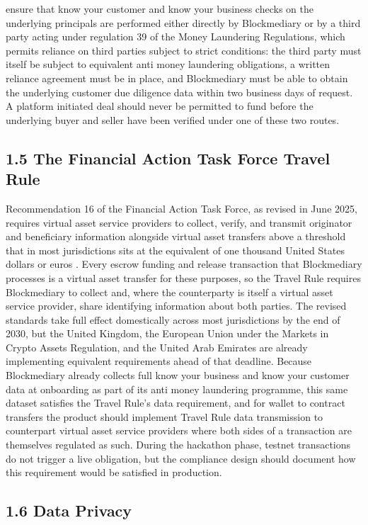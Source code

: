 \documentclass[12pt, a4paper]{article}
\begin{document}
ensure that know your customer and know your business checks on the underlying principals
are performed either directly by Blockmediary or by a third party acting under regulation
39 of the Money Laundering Regulations, which permits reliance on third parties subject to
strict conditions: the third party must itself be subject to equivalent anti money
laundering obligations, a written reliance agreement must be in place, and Blockmediary
must be able to obtain the underlying customer due diligence data within two business days
of request. A platform initiated deal should never be permitted to fund before the
underlying buyer and seller have been verified under one of these two routes.

\subsection*{1.5 The Financial Action Task Force Travel Rule}

Recommendation 16 of the Financial Action Task Force, as revised in June 2025, requires
virtual asset service providers to collect, verify, and transmit originator and
beneficiary information alongside virtual asset transfers above a threshold that in most
jurisdictions sits at the equivalent of one thousand United States dollars or euros
\citep{fatf2025}. Every escrow funding and release transaction that Blockmediary processes
is a virtual asset transfer for these purposes, so the Travel Rule requires Blockmediary to
collect and, where the counterparty is itself a virtual asset service provider, share
identifying information about both parties. The revised standards take full effect
domestically across most jurisdictions by the end of 2030, but the United Kingdom, the
European Union under the Markets in Crypto Assets Regulation, and the United Arab Emirates
are already implementing equivalent requirements ahead of that deadline. Because
Blockmediary already collects full know your business and know your customer data at
onboarding as part of its anti money laundering programme, this same dataset satisfies the
Travel Rule's data requirement, and for wallet to contract transfers the product should
implement Travel Rule data transmission to counterpart virtual asset service providers
where both sides of a transaction are themselves regulated as such. During the hackathon
phase, testnet transactions do not trigger a live obligation, but the compliance design
should document how this requirement would be satisfied in production.

\subsection*{1.6 Data Privacy}
\end{document}
